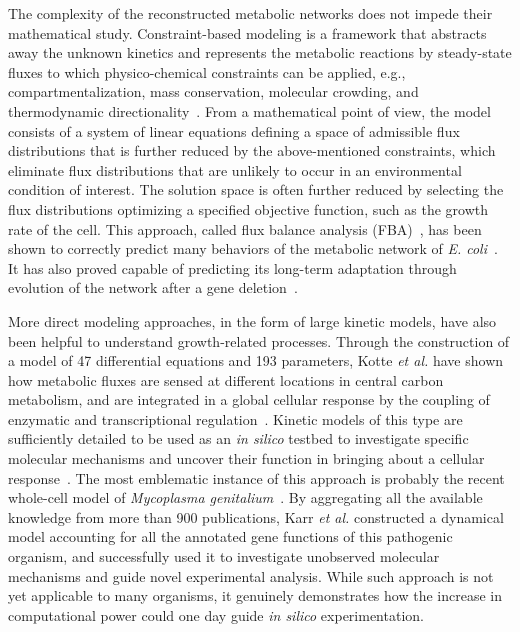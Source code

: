 The complexity of the reconstructed metabolic networks does not impede their mathematical study.
Constraint-based modeling is a framework that abstracts away the unknown kinetics and represents the metabolic reactions by steady-state fluxes to which physico-chemical constraints can be applied, e.g., compartmentalization, mass conservation, molecular crowding, and thermodynamic directionality~\cite{ebrahim_cobrapy_2013}.
From a mathematical point of view, the model consists of a system of linear equations defining a space of admissible flux distributions that is further reduced by the above-mentioned constraints, which eliminate flux distributions that are unlikely to occur in an environmental condition of interest.
The solution space is often further reduced by selecting the flux distributions optimizing a specified objective function, such as the growth rate of the cell.
This approach, called flux balance analysis (FBA)~\cite{orth_comprehensive_2011,palsson_systems_2011}, has been shown to correctly predict many behaviors of the metabolic network of \textit{E. coli}~\cite{varma_stoichiometric_1994,edwards_silico_2001}.
It has also proved capable of predicting its long-term adaptation through evolution of the network after a gene deletion~\cite{fong_metabolic_2004}.

More direct modeling approaches, in the form of large kinetic models, have also been helpful to understand growth-related processes.
Through the construction of a model of 47 differential equations and 193 parameters, Kotte \textit{et al.} have shown how metabolic fluxes are sensed at different locations in central carbon metabolism, and are integrated in a global cellular response by the coupling of enzymatic and transcriptional regulation~\cite{kotte_bacterial_2010}.
Kinetic models of this type are sufficiently detailed to be used as an \textit{in silico} testbed to investigate specific molecular mechanisms and uncover their function in bringing about a cellular response~\cite{peskov_kinetic_2012}.
The most emblematic instance of this approach is probably the recent whole-cell model of \textit{Mycoplasma genitalium}~\cite{karr_whole-cell_2012}.
By aggregating all the available knowledge from more than 900 publications, Karr \textit{et al.} constructed a dynamical model accounting for all the annotated gene functions of this pathogenic organism, and successfully used it to investigate unobserved molecular mechanisms and guide novel experimental analysis.
While such approach is not yet applicable to many organisms, it genuinely demonstrates how the increase in computational power could one day guide \textit{in silico} experimentation.

